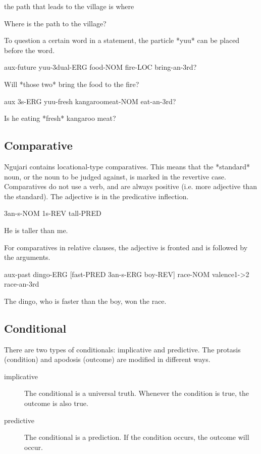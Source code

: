 the path that leads to the village is where

Where is the path to the village?

To question a certain word in a statement, the particle *yuu* can be placed
before the word.

aux-future yuu-3dual-ERG food-NOM fire-LOC bring-an-3rd?

Will *those two* bring the food to the fire?

aux 3s-ERG yuu-fresh kangaroomeat-NOM eat-an-3rd?

Is he eating *fresh* kangaroo meat?

\subsection{Comparative}

Ngujari contains locational-type comparatives. This means that the *standard*
noun, or the noun to be judged against, is marked in the revertive case.
Comparatives do not use a verb, and are always positive (i.e. more adjective
than the standard). The adjective is in the predicative inflection.

3an-s-NOM 1s-REV tall-PRED

He is taller than me.

For comparatives in relative clauses, the adjective is fronted and is followed
by the arguments.

aux-past dingo-ERG [fast-PRED 3an-s-ERG boy-REV] race-NOM valence1->2
race-an-3rd

The dingo, who is faster than the boy, won the race.

\subsection{Conditional}

There are two types of conditionals: implicative and predictive. The protasis
(condition) and apodosis (outcome) are modified in different ways.

\begin{description}
\item[implicative] The conditional is a universal truth. Whenever the condition
  is true, the outcome is also true.
\item[predictive] The conditional is a prediction. If the condition occurs, the
  outcome will occur.
\end{description}

